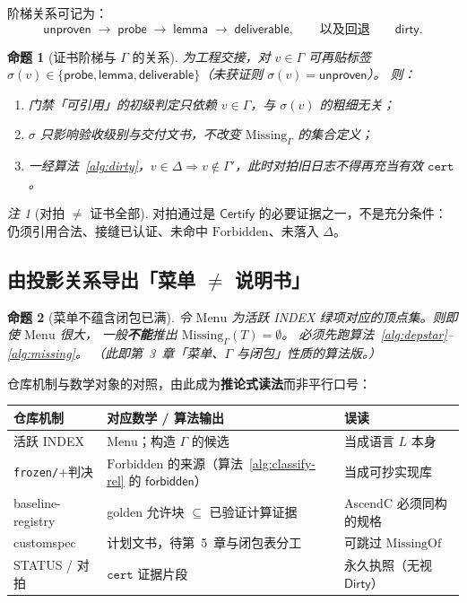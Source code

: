 \documentclass[UTF8,a4paper,11pt]{ctexart}
\theoremstyle{definition}
\theoremstyle{plain}
\newtheorem{proposition}{命题}[section]
\theoremstyle{remark}
\newtheorem{remark}{注}[section]
\numberwithin{figure}{section}
\numberwithin{table}{section}
\begin{document}
阶梯关系可记为：
\[
\mathsf{unproven}
\;\longrightarrow\;
\mathsf{probe}
\;\longrightarrow\;
\mathsf{lemma}
\;\longrightarrow\;
\mathsf{deliverable},
\qquad\text{以及回退}\qquad
\mathsf{dirty}.
\]

\begin{proposition}[证书阶梯与 $\Gamma$ 的关系]
\label{prop:cert-ladder}
为工程交接，对 $v\in\Gamma$ 可再贴标签
$\sigma(v)\in\{\mathsf{probe},\mathsf{lemma},\mathsf{deliverable}\}$（未获证则 $\sigma(v)=\mathsf{unproven}$）。
则：
\begin{enumerate}
  \item 门禁「可引用」的初级判定只依赖 $v\in\Gamma$，与 $\sigma(v)$ 的粗细无关；
  \item $\sigma$ 只影响验收级别与交付文书，不改变 $\mathrm{Missing}_\Gamma$ 的集合定义；
  \item 一经算法~\ref{alg:dirty}，$v\in\Delta\Rightarrow v\notin\Gamma'$，此时对拍旧日志不得再充当有效 $\texttt{cert}$。
\end{enumerate}
\end{proposition}

\begin{remark}[对拍 $\neq$ 证书全部]
对拍通过是 $\mathsf{Certify}$ 的必要证据之一，不是充分条件：
仍须引用合法、接缝已认证、未命中 $\mathrm{Forbidden}$、未落入 $\Delta$。
\end{remark}

\subsection{由投影关系导出「菜单 $\neq$ 说明书」}
\label{sec:math-repo}

\begin{proposition}[菜单不蕴含闭包已满]
\label{prop:menu-not-L}
令 $\mathrm{Menu}$ 为活跃 INDEX 绿项对应的顶点集。则即使 $\mathrm{Menu}$ 很大，
一般\textbf{不能}推出 $\mathrm{Missing}_\Gamma(T)=\emptyset$。
必须先跑算法~\ref{alg:depstar}--\ref{alg:missing}。
（此即第~3~章「菜单、$\Gamma$ 与闭包」性质的算法版。）
\end{proposition}

仓库机制与数学对象的对照，由此成为\textbf{推论式读法}而非平行口号：

\begin{center}
\begin{tabular}{@{}L{3.2cm}L{5.2cm}L{5.4cm}@{}}
  \toprule
  仓库机制 & 对应数学 / 算法输出 & 误读 \\
  \midrule
  活跃 INDEX & $\mathrm{Menu}$；构造 $\Gamma$ 的候选 & 当成语言 $L$ 本身 \\
  \texttt{frozen/}+判决 & $\mathrm{Forbidden}$ 的来源（算法~\ref{alg:classify-rel} 的 $\mathsf{forbidden}$） & 当成可抄实现库 \\
  baseline-registry & golden 允许块 $\subseteq$ 已验证计算证据 & AscendC 必须同构的规格 \\
  customspec & 计划文书，待第~5~章与闭包表分工 & 可跳过 $\mathrm{MissingOf}$ \\
  STATUS / 对拍 & $\texttt{cert}$ 证据片段 & 永久执照（无视 $\mathsf{Dirty}$） \\
  \bottomrule
\end{tabular}
\end{center}
\end{document}
